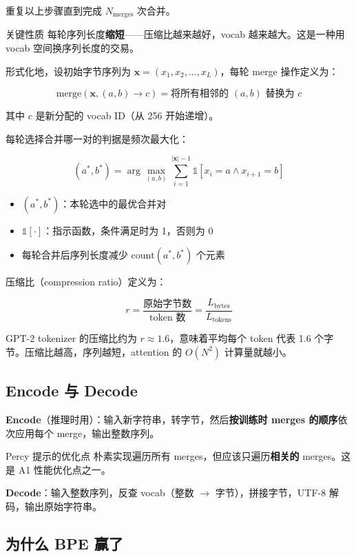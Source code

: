 \documentclass[a4paper]{article}
\begin{document}
重复以上步骤直到完成 $N_{\text{merges}}$ 次合并。

\begin{importantbox}{关键性质}
每轮序列长度\textbf{缩短}——压缩比越来越好，vocab 越来越大。这是一种用 vocab 空间换序列长度的交易。
\end{importantbox}

形式化地，设初始字节序列为 $\mathbf{x} = (x_1, x_2, \ldots, x_L)$，每轮 merge 操作定义为：

\[
\text{merge}(\mathbf{x}, (a, b) \to c) = \text{将所有相邻的 } (a,b) \text{ 替换为 } c
\]

其中 $c$ 是新分配的 vocab ID（从 256 开始递增）。

每轮选择合并哪一对的判据是频次最大化：

\[
(a^*, b^*) = \arg\max_{(a,b)} \sum_{i=1}^{|\mathbf{x}|-1} \mathbb{1}[x_i = a \wedge x_{i+1} = b]
\]

\begin{itemize}
\item $(a^*, b^*)$：本轮选中的最优合并对
\item $\mathbb{1}[\cdot]$：指示函数，条件满足时为 1，否则为 0
\item 每轮合并后序列长度减少 $\text{count}(a^*, b^*)$ 个元素
\end{itemize}

压缩比（compression ratio）定义为：

\[
r = \frac{\text{原始字节数}}{\text{token 数}} = \frac{L_{\text{bytes}}}{L_{\text{tokens}}}
\]

GPT-2 tokenizer 的压缩比约为 $r \approx 1.6$，意味着平均每个 token 代表 1.6 个字节。压缩比越高，序列越短，attention 的 $O(N^2)$ 计算量就越小。

\subsection{Encode 与 Decode}

\textbf{Encode}（推理时用）：输入新字符串，转字节，然后\textbf{按训练时 merges 的顺序}依次应用每个 merge，输出整数序列。

\begin{warningbox}{Percy 提示的优化点}
朴素实现遍历所有 merges，但应该只遍历\textbf{相关的} merges。这是 A1 性能优化点之一。
\end{warningbox}

\textbf{Decode}：输入整数序列，反查 vocab（整数 $\to$ 字节），拼接字节，UTF-8 解码，输出原始字符串。

\subsection{为什么 BPE 赢了}
\end{document}
